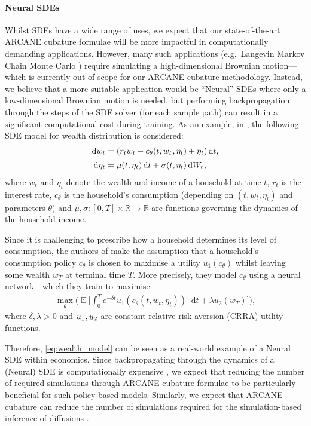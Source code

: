 \documentclass[11pt, letterpaper]{article}
\theoremstyle{definition}
\theoremstyle{remark}
\DeclareMathOperator{\E}{\mathbb{E}}
\newcommand{\R}{\mathbb{R}}
\newcommand{\m}{\hspace{0.25mm}}
\newcommand{\diff}{\mathop{}\!\mathrm{d}}
\begin{document}
\paragraph{Neural SDEs} Whilst SDEs have a wide range of uses, we expect that our state-of-the-art ARCANE cubature formulae will be more impactful in computationally demanding applications.
However, many such applications (e.g.~Langevin Markov Chain Monte Carlo \cite{scott2025langevin}) require simulating a high-dimensional Brownian motion---which is currently out of scope for our ARCANE cubature methodology. Instead, we believe that a more suitable application would be ``Neural'' SDEs \cite{li2020NSDEs, kidger2021neural, kidger2021efficient} where only a low-dimensional Brownian motion is needed, but performing backpropagation through the steps of the SDE solver (for each sample path) can result in a significant computational cost during training.
As an example, in \cite{chen2025wealth}, the following SDE model for wealth distribution is considered:
\begin{align}\label{eq:wealth_model}
\begin{split}
\diff w_t & = (r_t w_t - c_\theta(t, w_t\m, \eta_t) + \eta_t) \diff t,\\[2pt]
\diff\eta_t & = \mu(t, \eta_t) \diff t + \sigma(t, \eta_t) \diff W_t\m,
\end{split}
\end{align}
where $w_t$ and $\eta_t$ denote the wealth and income of a household at time $t$, $r_t$ is the interest rate, $c_\theta$ is the household's consumption (depending on $(t, w_t, \eta_t)$ and parameters $\theta$) and $\mu, \sigma : [0,T]\times\R\rightarrow\R$ are functions governing the dynamics of the household income.

Since it is challenging to prescribe how a household determines its level of consumption, the authors of \cite{chen2025wealth} make the assumption that a household's consumption policy $c_\theta$ is chosen to maximise a utility $u_1(c_\theta)$ whilst leaving some wealth $w_T$ at terminal time $T$.
More precisely, they model $c_\theta$ using a neural network---which they train to maximise  
\begin{align*}
\max_{\theta} \bigg(\E\bigg[\int_0^T e^{-\delta t}u_1(c_\theta(t, w_t, \eta_t)) \diff t + \lambda u_2(w_T)\bigg]\bigg),
\end{align*}
where $\delta, \lambda > 0$ and $u_1\m, u_2$ are constant-relative-risk-aversion (CRRA) utility functions.

Therefore, \eqref{eq:wealth_model} can be seen as a real-world example of a Neural SDE within economics. Since backpropagating through the dynamics of a (Neural) SDE is computationally expensive \cite{kidger2021neural}, we expect that reducing the number of required simulations through ARCANE cubature formulae to be particularly beneficial for such policy-based models. Similarly, we expect that ARCANE cubature can reduce the number of simulations required for the simulation-based inference of diffusions \cite{jovanovski2025SBI}.
\end{document}

